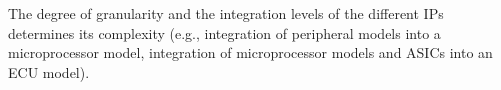 The degree of granularity and the integration levels of the different IPs determines its complexity (e.g., integration of peripheral models into a microprocessor model, integration of microprocessor models and ASICs into an ECU model).



